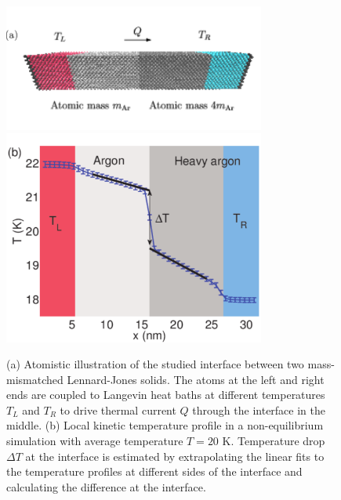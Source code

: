 \begin{figure}[tb]
 \begin{center}
  \includegraphics[width=8.6cm]{pics/nemd_fig2a.pdf}
  \includegraphics[width=8.6cm]{pics/nemd_fig2b.pdf}
  \caption{(a) Atomistic illustration of the studied interface between two mass-mismatched Lennard-Jones solids. The atoms at the left and right ends are coupled to Langevin heat baths at different temperatures $T_L$ and $T_R$ to drive thermal current $Q$ through the interface in the middle. (b) Local kinetic temperature profile in a non-equilibrium simulation with average temperature $T=20$ K. Temperature drop $\Delta T$ at the interface is estimated by extrapolating the linear fits to the temperature profiles at different sides of the interface and calculating the difference at the interface. } 
 \label{fig:nemd_fig2}
 \end{center}
\end{figure}

